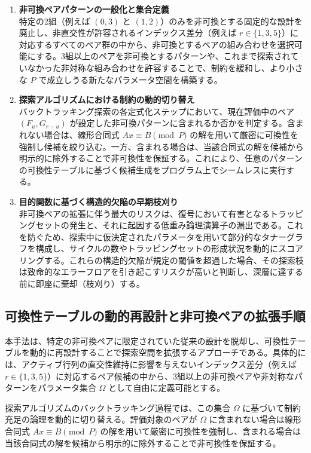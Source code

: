 \documentclass[a4paper,11pt,dvipdfmx]{jsarticle}
\theoremstyle{definition}
\begin{document}
\begin{enumerate}
    \item \textbf{非可換ペアパターンの一般化と集合定義}\\
    特定の2組（例えば $(0, 3)$ と $(1, 2)$）のみを非可換とする固定的な設計を廃止し、非直交性が許容されるインデックス差分（例えば $r \in \{1, 3, 5\}$）に対応するすべてのペア群の中から、非可換とするペアの組み合わせを選択可能にする。3組以上のペアを非可換とするパターンや、これまで探索されていなかった非対称な組み合わせを許容することで、制約を緩和し、より小さな $P$ で成立しうる新たなパラメータ空間を構築する。

    \item \textbf{探索アルゴリズムにおける制約の動的切り替え}\\
    バックトラッキング探索の各定式化ステップにおいて、現在評価中のペア $(F_u, G_{r-u})$ が設定した非可換パターンに含まれるか否かを判定する。含まれない場合は、線形合同式 $Ax \equiv B \pmod P$ の解を用いて厳密に可換性を強制し候補を絞り込む。一方、含まれる場合は、当該合同式の解を候補から明示的に除外することで非可換性を保証する。これにより、任意のパターンの可換性テーブルに基づく候補生成をプログラム上でシームレスに実行する。

    \item \textbf{目的関数に基づく構造的欠陥の早期枝刈り}\\
    非可換ペアの拡張に伴う最大のリスクは、復号において有害となるトラッピングセットの発生と、それに起因する低重み論理演算子の漏出である。これを防ぐため、探索中に仮決定されたパラメータを用いて部分的なタナーグラフを構成し、サイクルの数やトラッピングセットの形成状況を動的にスコアリングする。これらの構造的欠陥が規定の閾値を超過した場合、その探索枝は致命的なエラーフロアを引き起こすリスクが高いと判断し、深層に達する前に即座に棄却（枝刈り）する。
\end{enumerate}
\subsection{可換性テーブルの動的再設計と非可換ペアの拡張手順}

本手法は、特定の非可換ペアに限定されていた従来の設計を脱却し、可換性テーブルを動的に再設計することで探索空間を拡張するアプローチである。具体的には、アクティブ行列の直交性維持に影響を与えないインデックス差分（例えば $r \in \{1, 3, 5\}$）に対応するペア候補の中から、3組以上の非可換ペアや非対称なパターンをパラメータ集合 $\Omega$ として自由に定義可能とする。

探索アルゴリズムのバックトラッキング過程では、この集合 $\Omega$ に基づいて制約充足の論理を動的に切り替える。評価対象のペアが $\Omega$ に含まれない場合は線形合同式 $Ax \equiv B \pmod P$ の解を用いて厳密に可換性を強制し、含まれる場合は当該合同式の解を候補から明示的に除外することで非可換性を保証する。
\end{document}
